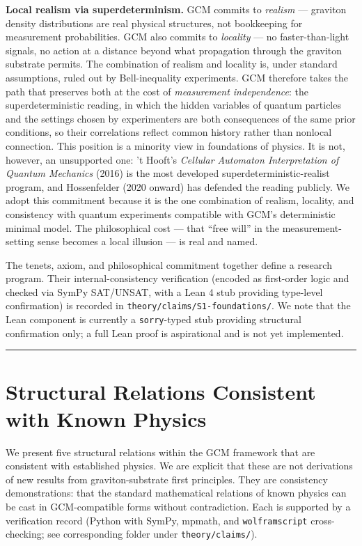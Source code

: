 \documentclass[12pt]{article}
\theoremstyle{definition}
\theoremstyle{remark}
\begin{document}
\textbf{Local realism via superdeterminism.} GCM commits to
\emph{realism} --- graviton density distributions are real physical
structures, not bookkeeping for measurement probabilities. GCM also
commits to \emph{locality} --- no faster-than-light signals, no action
at a distance beyond what propagation through the graviton substrate
permits. The combination of realism and locality is, under standard
assumptions, ruled out by Bell-inequality experiments. GCM therefore
takes the path that preserves both at the cost of \emph{measurement
independence}: the superdeterministic reading, in which the hidden
variables of quantum particles and the settings chosen by experimenters
are both consequences of the same prior conditions, so their
correlations reflect common history rather than nonlocal connection.
This position is a minority view in foundations of physics. It is not,
however, an unsupported one: 't Hooft's \emph{Cellular Automaton
Interpretation of Quantum Mechanics} (2016) is the most developed
superdeterministic-realist program, and Hossenfelder (2020 onward) has
defended the reading publicly. We adopt this commitment because it is
the one combination of realism, locality, and consistency with quantum
experiments compatible with GCM's deterministic minimal model. The
philosophical cost --- that ``free will'' in the measurement-setting
sense becomes a local illusion --- is real and named.

The tenets, axiom, and philosophical commitment together define a
research program. Their internal-consistency verification (encoded as
first-order logic and checked via SymPy SAT/UNSAT, with a Lean 4 stub
providing type-level confirmation) is recorded in
\texttt{theory/claims/S1-foundations/}. We note that the Lean component
is currently a \texttt{sorry}-typed stub providing structural
confirmation only; a full Lean proof is aspirational and is not yet
implemented.

\begin{center}\rule{0.5\linewidth}{0.5pt}\end{center}

\section{Structural Relations Consistent with Known Physics}\label{sec:scaffolds}

We present five structural relations within the GCM framework that are
consistent with established physics. We are explicit that these are not
derivations of new results from graviton-substrate first principles.
They are consistency demonstrations: that the standard mathematical
relations of known physics can be cast in GCM-compatible forms without
contradiction. Each is supported by a verification record (Python with
SymPy, mpmath, and \texttt{wolframscript} cross-checking; see
corresponding folder under \texttt{theory/claims/}).
\end{document}
